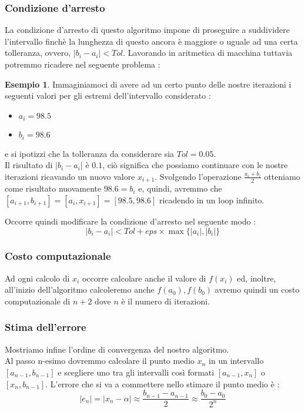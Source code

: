 \documentclass[12pt, a4paper]{book}
\theoremstyle{definition}
\newtheorem{exmp}{Esempio}[section]
\begin{document}
\begin{flushleft}
\subsubsection{Condizione d'arresto}
La condizione d'arresto di questo algoritmo impone di proseguire a suddividere l'intervallo finchè la lunghezza di questo ancora è maggiore o uguale ad una certa tolleranza, ovvero, $|b_{i} - a_{i}| < Tol$.
Lavorando in aritmetica di macchina tuttavia potremmo ricadere nel seguente problema : 
\begin{exmp}
Immaginiamoci di avere ad un certo punto delle nostre iterazioni i seguenti valori per gli estremi dell'intervallo considerato : 
\begin{itemize}
	\item $a_{i} = 98.5$
	\item $b_{i} = 98.6$
\end{itemize}
e si ipotizzi che la tolleranza da considerare sia $Tol = 0.05$. \\
Il risultato di $|b_{i} - a_{i}|$  è $0.1$, ciò significa che possiamo continuare con le nostre iterazioni ricavando un nuovo valore  $x_{i + 1}$.  Svolgendo l'operazione $\frac{a_{i}+b_{i}}{2}$ otteniamo come risultato nuovamente $98.6 = b_{i}$ e, quindi, avremmo che $[a_{i+1}, b_{i+1}] = [a_{i}, x_{i+1}] = [98.5,98.6]$ ricadendo in un loop infinito. 
\end{exmp}
Occorre quindi modificare la condizione d'arresto nel seguente modo : 
\[ 
	|b_{i} - a_{i}| < Tol + eps \times \max \{|a_{i}|, |b_{i}|\}
\]

\subsubsection{Costo computazionale}
Ad ogni calcolo di $x_{i}$ occorre calcolare anche il valore di $f(x_{i})$ ed, inoltre, all'inizio dell'algoritmo calcoleremo anche $f(a_{0}),f(b_{0})$ avremo quindi un costo computazionale di $n+2$ dove $n$ è il numero di iterazioni.


\subsubsection{Stima dell'errore}
Mostriamo infine l'ordine di convergenza del nostro algoritmo. \\
Al passo n-esimo dovremmo calcolare il punto medio $x_{n}$ in un intervallo $[a_{n-1}, b_{n-1}]$ e scegliere uno tra gli intervalli così formati $[a_{n-1},x_{n}]$ o $[x_{n},b_{n-1}]$.
L'errore che si va a commettere nello stimare il punto medio è :
\[
	|e_{n}| = | x_{n} - \alpha | \approx \frac{b_{n-1} - a_{n-1}}{2} \approx  \frac{b_{0} - a_{0}}{2^{n}}
\]


\end{flushleft}
\end{document}
